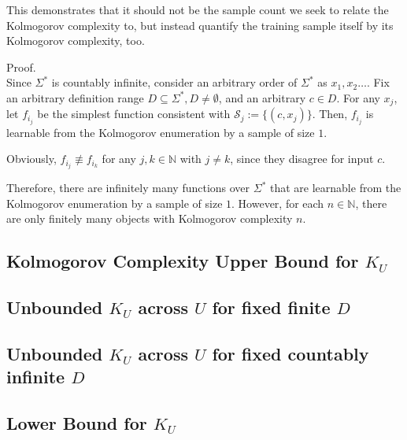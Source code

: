 This demonstrates that it should not be the sample count we seek to relate the Kolmogorov complexity to, but instead quantify the training sample itself by its Kolmogorov complexity, too.

Proof.\\
Since $\Sigma^{*}$ is countably infinite, consider an arbitrary order of $\Sigma^{*}$ as $x_1,x_2\dots$.
Fix an arbitrary definition range $D\subseteq\Sigma^{*}, D \neq \emptyset$, and an arbitrary $c\in D$.
For any $x_j$, let $f_{i_{j}}$ be the simplest function consistent with $\mathcal{S}_j:=\{(c,x_j)\}$. Then, $f_{i_{j}}$ is learnable from the Kolmogorov enumeration by a sample of size $1$.

Obviously, $f_{i_{j}}\not \equiv f_{i_{k}}$ for any $j,k\in\mathbb{N}$ with $j\neq k$, since they disagree for input $c$.

Therefore, there are infinitely many functions over $\Sigma^{*}$ that are learnable from the Kolmogorov enumeration by a sample of size $1$. However, for each $n\in\mathbb{N}$, there are only finitely many objects with Kolmogorov complexity $n$. 
\subsection{Kolmogorov Complexity Upper Bound for $K_U$}
\subsection{Unbounded $K_U$ across $U$ for fixed finite $D$}
\subsection{Unbounded $K_U$ across $U$ for fixed countably infinite $D$}
\subsection{Lower Bound for $K_U$}